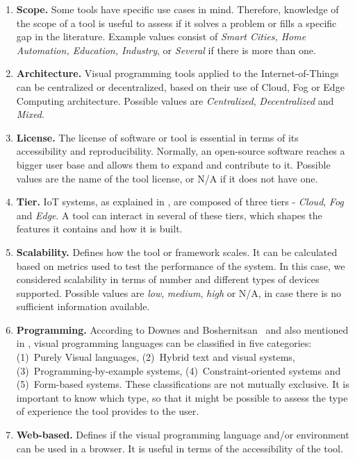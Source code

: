 \begin{enumerate}
    \item\textbf{Scope.} Some tools have specific use cases in mind. Therefore, knowledge of the scope of a tool is useful to assess if it solves a problem or fills a specific gap in the literature. Example values consist of \textit{Smart Cities, Home Automation, Education, Industry}, or \textit{Several} if there is more than one. 
    \item\textbf{Architecture.} Visual programming tools applied to the Internet-of-Things can be centralized or decentralized, based on their use of Cloud, Fog or Edge Computing architecture. Possible values are \textit{Centralized}, \textit{Decentralized} and \textit{Mixed}.
    \item\textbf{License.} The license of software or tool is essential in terms of its accessibility and reproducibility. Normally, an open-source software reaches a bigger user base and allows them to expand and contribute to it. Possible values are the name of the tool license, or N/A if it does not have one.
    \item\textbf{Tier.} IoT systems, as explained in , are composed of three tiers - \textit{Cloud}, \textit{Fog} and \textit{Edge}. A tool can interact in several of these tiers, which shapes the features it contains and how it is built.
    \item\textbf{Scalability.} Defines how the tool or framework scales. It can be calculated based on metrics used to test the performance of the system. In this case, we considered scalability in terms of number and different types of devices supported. Possible values are \textit{low}, \textit{medium}, \textit{high} or N/A, in case there is no sufficient information available.
    \item\textbf{Programming.} According to Downes and Boshernitsan~\cite{vpls_survey} and also mentioned in , visual programming languages can be classified in five categories: (1)~Purely Visual languages, (2)~Hybrid text and visual systems, (3)~Programming-by-example systems, (4)~Constraint-oriented systems and (5)~Form-based systems. These classifications are not mutually exclusive. It is important to know which type, so that it might be possible to assess the type of experience the tool provides to the user.
    \item\textbf{Web-based.} Defines if the visual programming language and/or environment can be used in a browser. It is useful in terms of the accessibility of the tool.
\end{enumerate}

